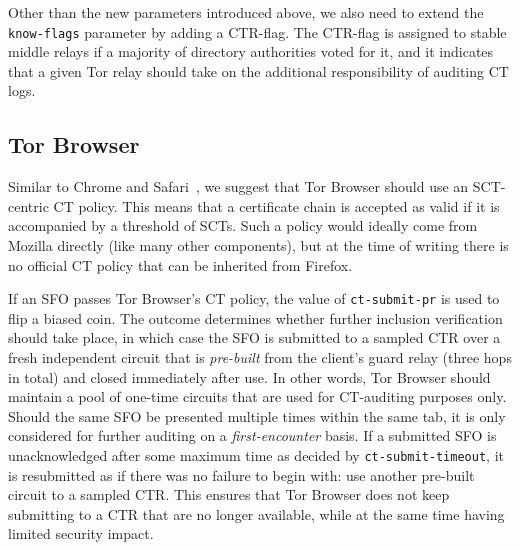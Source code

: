 Other than the new parameters introduced above, we also need to extend the
\texttt{know-flags} parameter by adding a CTR-flag.  The CTR-flag is 
assigned to stable middle relays if a majority of directory authorities voted
for it, and it indicates that a given Tor relay should take on the additional
responsibility of auditing CT logs.


\subsection{Tor Browser}
Similar to Chrome and Safari~\cite{chrome-policy,safari-policy}, we suggest that
Tor Browser should use an SCT-centric CT policy.  This means that a certificate
chain is accepted as valid if it is accompanied by a threshold of SCTs.  Such a
policy would ideally come from Mozilla directly (like many other components),
but at the time of writing there is no official CT policy that can be inherited
from Firefox.

If an SFO passes Tor Browser's CT policy, the value of
\texttt{ct-submit-pr} is used to flip a biased coin.  The outcome determines
whether further inclusion verification should take place, in which case the SFO
is submitted to a sampled CTR over a fresh independent circuit
that is \emph{pre-built} from the client's guard relay (three hops in total) 
and closed immediately after use.  In other words, Tor Browser should maintain a
pool of one-time circuits that are used for CT-auditing purposes only.
Should the same SFO be presented multiple times within the same tab, it is only
considered for further auditing on a \emph{first-encounter} basis.
If a submitted SFO is unacknowledged after some maximum time as decided by
\texttt{ct-submit-timeout}, it is resubmitted as if there was no failure to
begin with:
	use another pre-built circuit to a sampled CTR.
This ensures that Tor Browser does not keep submitting to a CTR that are no
longer available, while at the same time having limited security impact.

